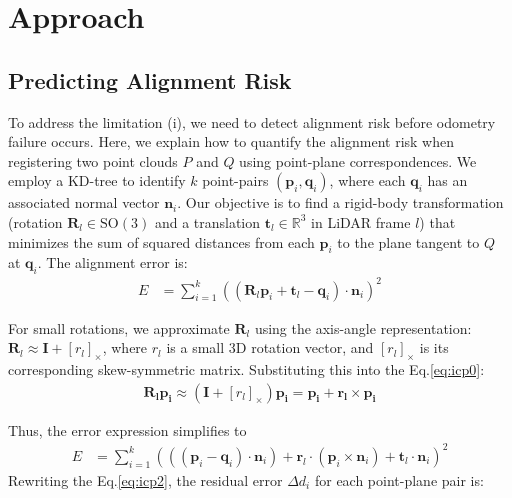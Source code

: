 \section{Approach}
\subsection{Predicting Alignment Risk}
To address the limitation (i), we need to detect alignment risk before odometry failure occurs. 
Here, we explain how to quantify the alignment risk when registering two point clouds $P$ and $Q$ using point-plane correspondences. We employ a KD-tree to identify $k$ point-pairs $(\mathbf{p}_i, \mathbf{q}_i)$, where each $\mathbf{q}_i$ has an associated normal vector $\mathbf{n}_i$. 
Our objective is to find a rigid-body transformation {(rotation $\mathbf{R}_l \in \mathrm{SO}(3)$ and a translation $\mathbf{t}_l\in \mathbb{R}^3$ in LiDAR frame $l$)} that minimizes the sum of squared distances from each $\mathbf{p}_i$ to the plane tangent to $Q$ at $\mathbf{q}_i$. The alignment error is:\begin{align}
E &= \sum_{i=1}^{k} \left( (\mathbf{R}_l \mathbf{p}_i + \mathbf{t}_l - \mathbf{q}_i) \cdot \mathbf{n}_i \right)^2
\label{eq:icp0}
\end{align}

For small rotations, we approximate $\mathbf{R}_l$ using the axis-angle representation:
$\mathbf{R}_l \approx \mathbf{I} + [r_l]_{\times}$, where $r_l$ is a small 3D rotation vector, and $[r_l]_{\times}$ is its corresponding skew-symmetric matrix. Substituting this into the Eq.\ref{eq:icp0}:
\begin{align}
\mathbf{R_l} \mathbf{p_i} \approx ( \mathbf{I} + [r_l]_{\times})\mathbf{p_i} = \mathbf{p_i} + \mathbf{r_l} \times \mathbf{p_i}
\label{eq:icp1}
\end{align}

Thus, the error expression simplifies to
\begin{align}E &= \sum_{i=1}^{k} \left( \left( (\mathbf{p}_i - \mathbf{q}_i) \cdot \mathbf{n}_i \right) + \mathbf{r}_l \cdot (\mathbf{p}_i \times \mathbf{n}_i) + \mathbf{t}_l \cdot \mathbf{n}_i \right)^2 
\label{eq:icp2}
\end{align}
Rewriting the Eq.\ref{eq:icp2}, the residual error $\Delta d_i$ for each point-plane pair is:

